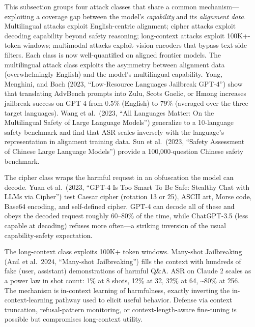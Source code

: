 This subsection groups four attack classes that share a common mechanism---exploiting a coverage gap between the model's \emph{capability} and its \emph{alignment data}. Multilingual attacks exploit English-centric alignment; cipher attacks exploit decoding capability beyond safety reasoning; long-context attacks exploit 100K+-token windows; multimodal attacks exploit vision encoders that bypass text-side filters. Each class is now well-quantified on aligned frontier models. The multilingual attack class exploits the asymmetry between alignment data (overwhelmingly English) and the model's multilingual capability. Yong, Menghini, and Bach (2023, ``Low-Resource Languages Jailbreak GPT-4'') show that translating AdvBench prompts into Zulu, Scots Gaelic, or Hmong increases jailbreak success on GPT-4 from 0.5\% (English) to 79\% (averaged over the three target languages). Wang et al.~(2023, ``All Languages Matter: On the Multilingual Safety of Large Language Models'') generalize to a 10-language safety benchmark and find that ASR scales inversely with the language's representation in alignment training data. Sun et al.~(2023, ``Safety Assessment of Chinese Large Language Models'') provide a 100,000-question Chinese safety benchmark.

The cipher class wraps the harmful request in an obfuscation the model can decode. Yuan et al.~(2023, ``GPT-4 Is Too Smart To Be Safe: Stealthy Chat with LLMs via Cipher'') test Caesar cipher (rotation 13 or 25), ASCII art, Morse code, Base64 encoding, and self-defined cipher. GPT-4 can decode all of these and obeys the decoded request roughly 60--80\% of the time, while ChatGPT-3.5 (less capable at decoding) refuses more often---a striking inversion of the usual capability-safety expectation.

The long-context class exploits 100K+ token windows. Many-shot Jailbreaking (Anil et al.~2024, ``Many-shot Jailbreaking'') fills the context with hundreds of fake (user, assistant) demonstrations of harmful Q\&A. ASR on Claude 2 scales as a power law in shot count: 1\% at 8 shots, 12\% at 32, 32\% at 64, \textasciitilde80\% at 256. The mechanism is in-context learning of harmfulness, exactly inverting the in-context-learning pathway used to elicit useful behavior. Defense via context truncation, refusal-pattern monitoring, or context-length-aware fine-tuning is possible but compromises long-context utility.

